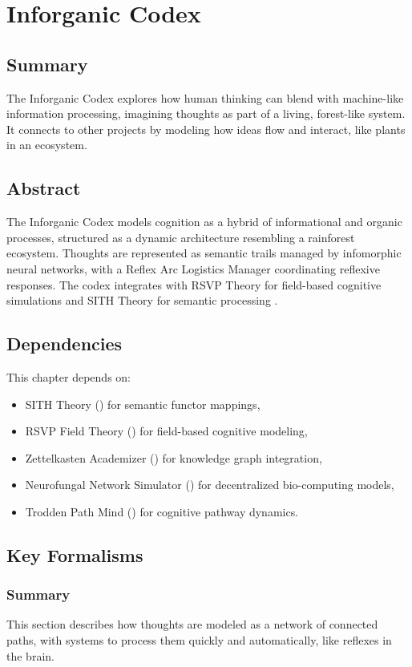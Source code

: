\documentclass[11pt,oneside]{memoir}
\theoremstyle{plain}
\begin{document}
\chapter{Inforganic Codex}
\label{sec:inforganic_codex}

\section{Summary}
The Inforganic Codex explores how human thinking can blend with machine-like information processing, imagining thoughts as part of a living, forest-like system. It connects to other projects by modeling how ideas flow and interact, like plants in an ecosystem.

\section{Abstract}
The Inforganic Codex models cognition as a hybrid of informational and organic processes, structured as a dynamic architecture resembling a rainforest ecosystem. Thoughts are represented as semantic trails managed by infomorphic neural networks, with a Reflex Arc Logistics Manager coordinating reflexive responses. The codex integrates with RSVP Theory for field-based cognitive simulations and SITH Theory for semantic processing \cite{maclane}.

\section{Dependencies}
This chapter depends on:
\begin{itemize}
    \item SITH Theory () for semantic functor mappings,
    \item RSVP Field Theory () for field-based cognitive modeling,
    \item Zettelkasten Academizer () for knowledge graph integration,
    \item Neurofungal Network Simulator () for decentralized bio-computing models,
    \item Trodden Path Mind () for cognitive pathway dynamics.
\end{itemize}

\section{Key Formalisms}
\subsection{Summary}
This section describes how thoughts are modeled as a network of connected paths, with systems to process them quickly and automatically, like reflexes in the brain.
\end{document}
